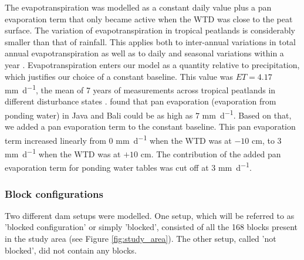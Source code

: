 \documentclass[bg, manuscript]{copernicus}
\begin{document}
The evapotranspiration was modelled as a constant daily value plus a pan evaporation term that only became active when the WTD was close to the peat surface.
The variation of evapotranspiration in tropical peatlands is considerably smaller than that of rainfall.
This applies both to inter-annual variations in total annual evapotranspiration as well as to daily and seasonal variations within a year \citep{hiranoEvapotranspirationTropicalPeat2015, watiComparisonPanEvaporation2018}.
Evapotranspiration enters our model as a quantity relative to precipitation, which justifies our choice of a constant baseline.
This value was $ET = 4.17$ \unit{mm d^{-1}}, the mean of 7 years of measurements across tropical peatlands in different disturbance states \citep{hiranoEvapotranspirationTropicalPeat2015}.
\cite{watiComparisonPanEvaporation2018} found that pan evaporation (evaporation from ponding water) in Java and Bali could be as high as $7$ \unit{mm d^{-1}}.
Based on that, we added a pan evaporation term to the constant baseline.
This pan evaporation term increased linearly from $0$ \unit{mm d^{-1}} when the WTD was at $-10$ \unit{cm}, to $3$  \unit{mm d^{-1}} when the WTD was at $+10$ \unit{cm}.
The contribution of the added pan evaporation term for ponding water tables was cut off at $3$ \unit{mm d^{-1}}.


\subsubsection{Block configurations}
Two different dam setups were modelled.
One setup, which will be referred to as  'blocked configuration' or simply 'blocked', consisted of all the 168 blocks present in the study area (see Figure \ref{fig:study_area}).
The other setup, called 'not blocked', did not contain any blocks.
\end{document}
